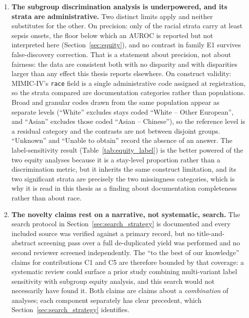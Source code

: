 \begin{enumerate}
    \item \textbf{The subgroup discrimination analysis is underpowered, and its
    strata are administrative.} Two distinct limits apply and neither
    substitutes for the other. On precision: only \pcNSubgroupsAboveFloor{} of
    the racial strata carry at least \pcMinSubgroupEvents{} sepsis onsets, the
    floor below which an AUROC is reported but not interpreted here
    (Section~\ref{sec:equity}), and no contrast in family E1 survives
    false-discovery correction. That is a statement about precision, not about
    fairness: the data are consistent both with no disparity and with
    disparities larger than any effect this thesis reports elsewhere. On
    construct validity: MIMIC-IV's \texttt{race} field is a single
    administrative code assigned at registration, so the strata compared are
    documentation categories rather than populations. Broad and granular codes
    drawn from the same population appear as separate levels (``White''
    excludes stays coded ``White -- Other European'', and ``Asian'' excludes
    those coded ``Asian -- Chinese''), so the reference level is a residual
    category and the contrasts are not between disjoint groups. ``Unknown'' and
    ``Unable to obtain'' record the absence of an answer. The
    label-sensitivity result (Table~\ref{tab:equity_label}) is the better
    powered of the two equity analyses because it is a stay-level proportion
    rather than a discrimination metric, but it inherits the same construct
    limitation, and its two significant strata are precisely the two
    missingness categories, which is why it is read in this thesis as a
    finding about documentation completeness rather than about race.

    \item \textbf{The novelty claims rest on a narrative, not systematic,
    search.} The search protocol in Section~\ref{sec:search_strategy} is
    documented and every included source was verified against a primary record,
    but no title-and-abstract screening pass over a full de-duplicated yield was
    performed and no second reviewer screened independently. The ``to the best
    of our knowledge'' claims for contributions C1 and C5 are therefore bounded
    by that coverage: a systematic review could surface a prior study combining
    multi-variant label sensitivity with subgroup equity analysis, and this
    search would not necessarily have found it. Both claims are claims about a
    \emph{combination} of analyses; each component separately has clear
    precedent, which Section~\ref{sec:search_strategy} identifies.


\end{enumerate}
